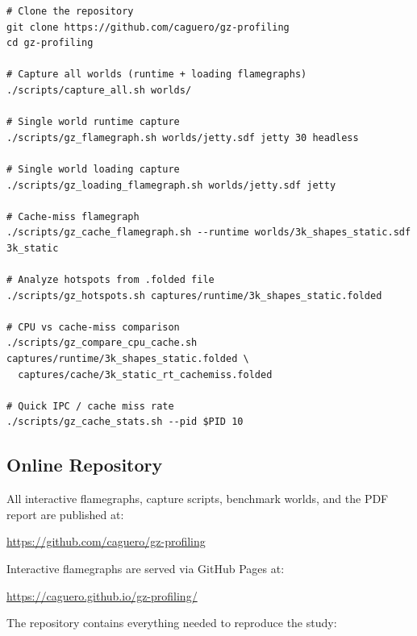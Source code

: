 \documentclass[11pt, a4paper]{article}
\begin{document}
\begin{verbatim}
# Clone the repository
git clone https://github.com/caguero/gz-profiling
cd gz-profiling

# Capture all worlds (runtime + loading flamegraphs)
./scripts/capture_all.sh worlds/

# Single world runtime capture
./scripts/gz_flamegraph.sh worlds/jetty.sdf jetty 30 headless

# Single world loading capture
./scripts/gz_loading_flamegraph.sh worlds/jetty.sdf jetty

# Cache-miss flamegraph
./scripts/gz_cache_flamegraph.sh --runtime worlds/3k_shapes_static.sdf 3k_static

# Analyze hotspots from .folded file
./scripts/gz_hotspots.sh captures/runtime/3k_shapes_static.folded

# CPU vs cache-miss comparison
./scripts/gz_compare_cpu_cache.sh captures/runtime/3k_shapes_static.folded \
  captures/cache/3k_static_rt_cachemiss.folded

# Quick IPC / cache miss rate
./scripts/gz_cache_stats.sh --pid $PID 10
\end{verbatim}

\subsection{Online Repository}

All interactive flamegraphs, capture scripts, benchmark worlds, and the PDF report are published at:

\begin{center}
\url{https://github.com/caguero/gz-profiling}
\end{center}

Interactive flamegraphs are served via GitHub Pages at:

\begin{center}
\url{https://caguero.github.io/gz-profiling/}
\end{center}

The repository contains everything needed to reproduce the study:
\end{document}
